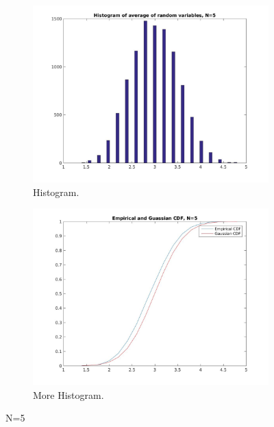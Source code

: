 \documentclass[12pt]{article}
\begin{document}
\begin{figure}[h!]
  \centering
  \begin{subfigure}[b]{0.4\linewidth}
    \includegraphics[width=\linewidth]{jpgs/histograms/5_hist.jpg}
    \caption{Histogram.}
  \end{subfigure}
  \begin{subfigure}[b]{0.4\linewidth}
    \includegraphics[width=\linewidth]{jpgs/cdfs/5_cdf.jpg}
    \caption{More Histogram.}
  \end{subfigure}
  \caption{N=5}
\end{figure}
\end{document}
